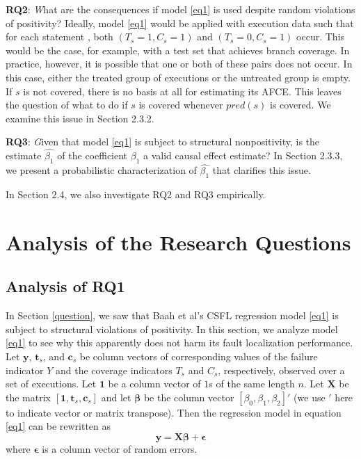 {\bf RQ2}: {\textit What are the consequences if model \eqref{eq1} is used despite random violations of positivity?}  Ideally, model \eqref{eq1} would be applied with execution data such that for each statement , both $(T_s=1,C_s=1)$ and $(T_s=0,C_s=1)$ occur.  This would be the case, for example, with a test set that achieves branch coverage.  In practice, however, it is possible that one or both of these pairs does not occur.  In this case, either the treated group of executions or the untreated group is empty.  If $s$ is not covered, there is no basis at all for estimating its AFCE.  This leaves the question of what to do if $s$ is covered whenever $pred(s)$ is covered.  We examine this issue in Section 2.3.2.

{\bf RQ3}: {\textit Given that model \eqref{eq1} is subject to structural nonpositivity, is the estimate $\hat{\beta_1}$ of the coefficient $\beta_1$ a valid causal effect estimate?}  In Section 2.3.3, we present a probabilistic characterization of $\hat{\beta_1}$ that clarifies this issue. 

In Section 2.4, we also investigate RQ2 and RQ3 empirically.

\section{Analysis of the Research Questions}\label{sec3}
\subsection{Analysis of RQ1}\label{sec3.1}

In Section \ref{question}, we saw that Baah et al’s CSFL regression model \eqref{eq1} is subject to structural violations of positivity.  In this section, we analyze model \eqref{eq1} to see why this apparently does not harm its fault localization performance.  Let $\mathbf{y}$, $\mathbf{t}_s$, and $\mathbf{c}_s$ be column vectors of corresponding values of the failure indicator $Y$ and the coverage indicators $T_s$ and $C_s$, respectively, observed over a set of executions.  Let $\mathbf{1}$ be a column vector of $1$s of the same length $n$.  Let $\mathbf{X}$ be the matrix $[\mathbf{1}, \mathbf{t}_s, \mathbf{c}_s]$ and let $\mathbf{\beta}$ be the column vector $[\beta_0, \beta_1, \beta_2]'$ (we use $'$ here to indicate vector or matrix transpose). Then the regression model in equation \eqref{eq1} can be rewritten as
\begin{equation}\label{eq2}
\mathbf{y}=\mathbf{X} \bm{\beta}+\bm{\epsilon}
\end{equation}
where $\bm{\epsilon}$ is a column vector of random errors.

